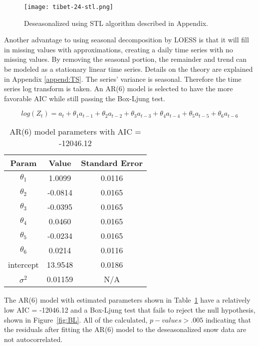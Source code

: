 \begin{figure}[ht]
\centering
\begin{minipage}{3in}
\texttt{[image: tibet-24-stl.png]}
\caption{Deseasonalized using STL algorithm described in Appendix.}
\label{fig:24_stl}
\end{minipage}
\end{figure}

Another advantage to using seasonal decomposition by LOESS is that it will fill in missing values with approximations, creating a daily time series with no missing values. By removing the seasonal portion, the remainder and trend can be modeled as a stationary linear time series. Details on the theory are explained in Appendix \ref{append:TS}. The series' variance is seasonal. Therefore the time series log transform is taken. An AR(6) model is selected to have the more favorable AIC while still passing the Box-Ljung test.

\begin{equation}
log(Z_t) = a_{t} + \theta_1 a_{t-1} + \theta_2 a_{t-2} + \theta_3 a_{t-3} + \theta_4 a_{t-4} + \theta_5 a_{t-5} + \theta_6 a_{t-6}
\end{equation}

\begin{table}[hbt]
\centering
\caption{AR(6) model parameters with AIC = -12046.12 \label{tbl:ar6}}
{\begin{tabular}{|c|c|c|}
\hline
\textbf{Param} & \textbf{Value} & \textbf{Standard Error}
\\ \hline
$\theta_1$ & 1.0099 & 0.0116
\\ \hline
$\theta_2$ & -0.0814 & 0.0165
\\ \hline
$\theta_3$ & -0.0395 & 0.0165
\\ \hline
$\theta_4$ & 0.0460 & 0.0165
\\ \hline
$\theta_5$ & -0.0234 & 0.0165
\\ \hline
$\theta_6$ & 0.0214 & 0.0116
\\ \hline
intercept & 13.9548 & 0.0186
\\ \hline
$\sigma^2$ & 0.01159 & N/A \\ \hline
\end{tabular}}
\end{table}

The AR(6) model with estimated parameters shown in Table~\ref{tbl:ar6} have a relatively low AIC = -12046.12 and a Box-Ljung test that fails to reject the null hypothesis, shown in Figure~\ref{fig:BL}. All of the calculated, $p-values>.005$ indicating that the residuals after fitting the AR(6) model to the deseasonalized snow data are not autocorrelated.


